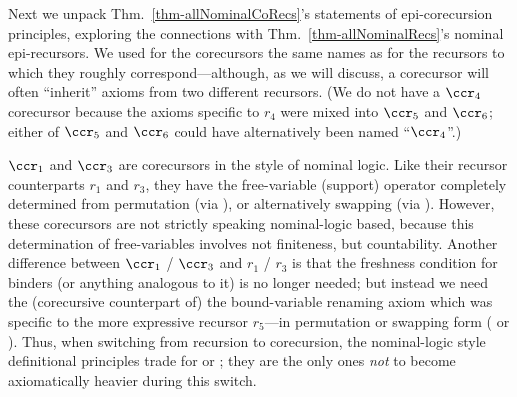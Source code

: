 Next we unpack Thm.~\ref{thm-allNominalCoRecs}'s %
statements of epi-corecursion principles, 
exploring the connections with Thm.~\ref{thm-allNominalRecs}'s 
%
nominal epi-recursors. 
%
We used for the corecursors the same names %
as for the recursors to which they roughly correspond---although, as we 
will %
discuss, a corecursor will often ``inherit'' axioms from two different recursors. (We do not have a $\ccr_4$ corecursor  %
because %
the axioms specific to $r_4$ %
were mixed into $\ccr_5$ and  $\ccr_6$; either of $\ccr_5$ and $\ccr_6$ could have alternatively been named ``$\ccr_4$''.) 

$\ccr_1$ and $\ccr_3$ are corecursors in the style of nominal logic. 
Like their recursor counterparts $r_1$ and $r_3$, they 
have the free-variable (support) operator completely determined from permutation (via \IFvDPm{}), or alternatively swapping (via \IFvDSw{}). However, these corecursors are not strictly speaking nominal-logic based, because this determination of free-variables involves not finiteness, but countability.  
%
%
Another %
difference between $\ccr_1$ / $\ccr_3$ and $r_1$ / $r_3$ is that the freshness condition for binders \FCB{} (or anything analogous to it) is no longer needed; but instead we need the (corecursive counterpart of) the bound-variable renaming axiom which was specific to the more expressive recursor $r_5$---in %
permutation or swapping form  (\IPmBvr{} or \ISwBvrT{}).   
Thus, when switching from recursion to corecursion, the nominal-logic style definitional principles trade \FCB{} for \IPmBvr{} or \ISwBvrT{}; they  
are the only ones \emph{not} to %
become axiomatically heavier during %
this switch. 

